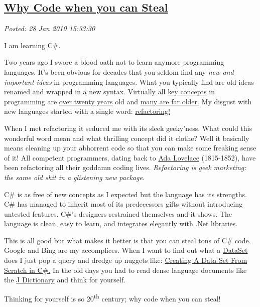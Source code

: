 %

\subsection*{\href{https://bakerjd99.wordpress.com/2010/01/28/why-code-when-you-can-steal/}{Why Code when you can Steal}}


\noindent\emph{Posted: 28 Jan 2010 15:33:30}
\vspace{6pt}

I am learning C\#.

Two years ago I swore a blood oath not to learn anymore programming
languages. It's been obvious for decades that you seldom find any
\emph{new and important ideas} in programming languages. What you
typically find are old ideas renamed and wrapped in a new syntax.
Virtually all
\href{http://www.cse.lehigh.edu/~gtan/historyOfFP/historyOfFP.html}{key
concepts} in programming are
\href{http://www.exforsys.com/tutorials/oops/the-history-of-object-oriented-programming.html}{over
twenty years} old and
\href{http://mathworld.wolfram.com/TuringMachine.html}{many are far
older.} My disgust with new languages started with a single word:
\href{http://c2.com/cgi/wiki?WhatIsRefactoring}{refactoring!}

When I met refactoring it seduced me with its sleek geeky'ness. What
could this wonderful word mean and what thrilling concept did it clothe?
Well it basically means cleaning up your abhorrent code so that you can
make some freaking sense of it! All competent programmers, dating back
to \href{http://www.sdsc.edu/ScienceWomen/lovelace.html}{Ada Lovelace}
(1815-1852), have been refactoring all their goddamn coding lives.
\emph{Refactoring is geek marketing: the same old shit in a glistening
new package.}

C\# is as free of new concepts as I expected but the language has its
strengths. C\# has managed to inherit most of its predecessors gifts
without introducing untested features. C\#'s designers restrained
themselves and it shows. The language is clean, easy to learn, and
integrates elegantly with .Net libraries.

This is all good but what makes it better is that you can steal tons of
C\# code. Google and Bing are my accomplices. When I want to find out
what a
\href{http://msdn.microsoft.com/en-us/library/system.data.dataset.aspx}{DataSet}
does I just pop a query and dredge up nuggets like:
\href{http://rhondatipton.net/2008/01/12/creating-a-data-set-from-scratch-in-c/}{Creating
A Data Set From Scratch in C\#.} In the old days you had to read dense
language documents like the
\href{http://www.jsoftware.com/help/dictionary/title.htm}{J Dictionary}
and think for yourself.

Thinking for yourself is so 20\textsuperscript{th} century; why code when you can steal!


%

